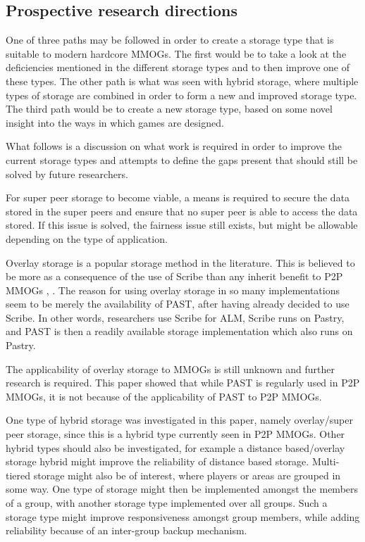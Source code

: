 \documentclass[10pt,a4paper,journal,cspaper,compsoc]{IEEEtran}
\begin{document}
\subsection{Prospective research directions}
One of three paths may be followed in order to create a storage type that is suitable to modern hardcore MMOGs. The first would be to take a look at
the deficiencies mentioned in the different storage types and to then improve one of these types. The other path is what was seen with hybrid
storage, where multiple types of storage are combined in order to form a new and improved storage type. The third path would be to create a new
storage type, based on some novel insight into the ways in which games are designed.

What follows is a discussion on what work is required in order to improve the current storage types and attempts to define the gaps present that
should still be solved by future researchers.

For super peer storage to become viable, a means is required to secure the data stored in the super peers and ensure that no super peer is able to
access the data stored. If this issue is solved, the fairness issue still exists, but might be allowable depending on the type of application.

Overlay storage is a popular storage method in the literature. This is believed to be more as a consequence of the use of Scribe \cite{scribe} than
any inherit benefit to P2P MMOGs \cite{past_storage_focus}, \cite{Fan_phd}. The reason for using overlay storage in so many implementations seem to
be merely the availability of PAST, after having already decided to use Scribe. In other words, researchers use Scribe for ALM, Scribe runs on
Pastry, and PAST is then a readily available storage implementation which also runs on Pastry.

The applicability of overlay storage to MMOGs is still unknown and further research is required. This paper showed that while PAST is regularly used
in P2P MMOGs, it is not because of the applicability of PAST to P2P MMOGs.

One type of hybrid storage was investigated in this paper, namely overlay/super peer storage, since this is a hybrid type currently seen in P2P
MMOGs. Other hybrid types should also be investigated, for example a distance based/overlay storage hybrid might improve the reliability of distance
based storage. Multi-tiered storage might also be of interest, where players or areas are grouped in some way. One type of storage might then be
implemented amongst the members of a group, with another storage type implemented over all groups. Such a storage type might improve responsiveness
amongst group members, while adding reliability because of an inter-group backup mechanism.
\end{document}

